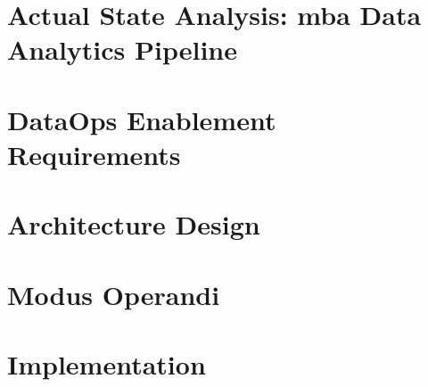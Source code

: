 
\section{Actual State Analysis: \acs{mba} Data Analytics Pipeline}
	
	\label{sec:4-analysis}
	
\section{DataOps Enablement Requirements}
	
	\label{sec:4-requirements}
	
\section{Architecture Design}
	
	\label{sec:4-architecture}
	
\section{Modus Operandi}
	
	\label{sec:4-modus-operandi}
	
\section{Implementation}
	
	\label{sec:4-implementation}